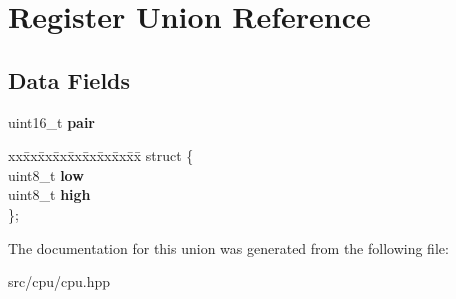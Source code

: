 \hypertarget{unionRegister}{}\section{Register Union Reference}
\label{unionRegister}
\subsection*{Data Fields}
\begin{DoxyCompactItemize}
\item 
\mbox{\label{unionRegister_aac323348d1529a834f8b013deecf048c}} 
uint16\+\_\+t {\bfseries pair}
\item 
\mbox{\label{unionRegister_a3d15b31854b2177c78cc4240849ce47e}} 
\begin{tabbing}
xx\=xx\=xx\=xx\=xx\=xx\=xx\=xx\=xx\=\kill
struct \{\\
\>uint8\_t {\bfseries low}\\
\>uint8\_t {\bfseries high}\\
\}; \\

\end{tabbing}\end{DoxyCompactItemize}


The documentation for this union was generated from the following file\+:\begin{DoxyCompactItemize}
\item 
src/cpu/cpu.\+hpp\end{DoxyCompactItemize}
